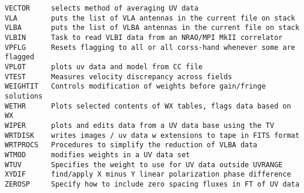 \begin{verbatim}
VECTOR     selects method of averaging UV data
VLA        puts the list of VLA antennas in the current file on stack
VLBA       puts the list of VLBA antennas in the current file on stack
VLBIN      Task to read VLBI data from an NRAO/MPI MkII correlator
VPFLG      Resets flagging to all or all corss-hand whenever some are flagged
VPLOT      plots uv data and model from CC file
VTEST      Measures velocity discrepancy across fields
WEIGHTIT   Controls modification of weights before gain/fringe solutions
WETHR      Plots selected contents of WX tables, flags data based on WX
WIPER      plots and edits data from a UV data base using the TV
WRTDISK    writes images / uv data w extensions to tape in FITS format
WRTPROCS   Procedures to simplify the reduction of VLBA data
WTMOD      modifies weights in a UV data set
WTUV       Specifies the weight to use for UV data outside UVRANGE
XYDIF      find/apply X minus Y linear polarization phase difference
ZEROSP     Specify how to include zero spacing fluxes in FT of UV data
\end{verbatim}\eve

\vfill\eject
{}

